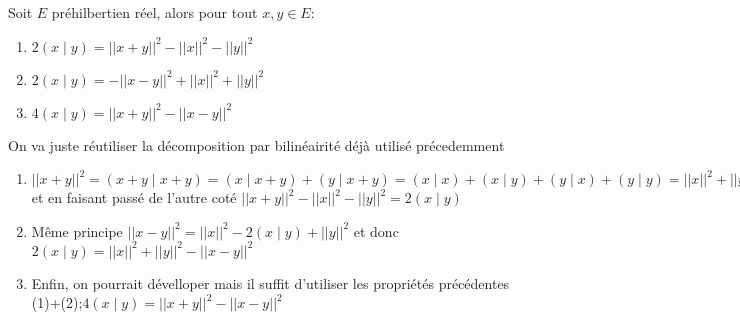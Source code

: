 \begin{prop}
    Soit $E$ préhilbertien réel, alors pour tout $x,y\in E$:
    \begin{enumerate}
        \item $2(x\mid y)=||x+y||^2-||x||^2-||y||^2$
        \item $2(x\mid y)=-||x-y||^2+||x||^2+||y||^2$
        \item $4(x\mid y)=||x+y||^2-||x-y||^2$
    \end{enumerate}
    \tcblower
    On va juste réutiliser la décomposition par bilinéairité déjà utilisé précedemment
    \begin{enumerate}
        \item $||x+y||^2=(x+y\mid x+y)=(x\mid x+y)+(y\mid x+y)=(x\mid x)+(x\mid y)+(y\mid x)+(y\mid y)=||x||^2+||y||^2+2(x\mid y)$ et en faisant passé de l'autre coté $||x+y||^2-||x||^2-||y||^2=2(x\mid y)$
        \item Même principe $||x-y||^2=||x||^2-2(x\mid y)+||y||^2$ et donc $2(x\mid y)=||x||^2+||y||^2-||x-y||^2$
        \item Enfin, on pourrait dévelloper mais il suffit d'utiliser les propriétés précédentes (1)+(2);$4(x\mid y)=||x+y||^2-||x-y||^2$
    \end{enumerate}
\end{prop}